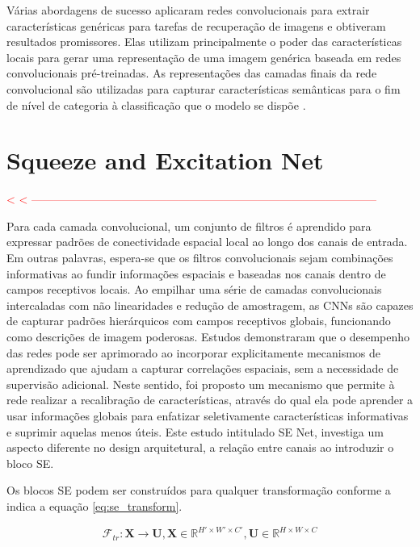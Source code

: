 Várias abordagens de sucesso aplicaram redes convolucionais para extrair características genéricas para tarefas de recuperação de imagens e obtiveram resultados promissores. Elas utilizam principalmente o poder das características locais para gerar uma representação de uma imagem genérica baseada em redes convolucionais pré-treinadas. As representações das camadas finais da rede convolucional são utilizadas para capturar características semânticas para o fim de nível de categoria à classificação que o modelo se dispõe \cite{alzubiContentbasedImageRetrieval2017b}.

\section{Squeeze and Excitation Net}
\label{sec:se_net}

\textcolor{red}{
< < --------------------------------------------------------------------------------------------
\newline
}

Para cada camada convolucional, um conjunto de filtros é aprendido para expressar padrões de conectividade espacial local ao longo dos canais de entrada. Em outras palavras, espera-se que os filtros convolucionais sejam combinações informativas ao fundir informações espaciais e baseadas nos canais dentro de campos receptivos locais.
Ao empilhar uma série de camadas convolucionais intercaladas com não linearidades e redução de amostragem, as \gls{CNN}s são capazes de capturar padrões hierárquicos com campos receptivos globais, funcionando como descrições de imagem poderosas. Estudos demonstraram que o desempenho das redes pode ser aprimorado ao incorporar explicitamente mecanismos de aprendizado que ajudam a capturar correlações espaciais, sem a necessidade de supervisão adicional. Neste sentido, foi proposto um mecanismo que permite à rede realizar a recalibração de características, através do qual ela pode aprender a usar informações globais para enfatizar seletivamente características informativas e suprimir aquelas menos úteis. Este estudo intitulado \gls{SE} Net, investiga um aspecto diferente no design arquitetural, a relação entre canais ao introduzir o bloco \gls{SE}.\cite{huSqueezeandExcitationNetworks2018}

Os blocos \gls{SE} podem ser construídos para qualquer transformação conforme a indica a equação \ref{eq:se_transform}. 

\begin{equation}
\mathcal{F}_{tr} : \mathbf{X} \rightarrow \mathbf{U}, \mathbf{X} \in \mathbb{R}^{H' \times W' \times C'}, \mathbf{U} \in \mathbb{R}^{H \times W \times C}
\label{eq:se_transform}
\end{equation}

